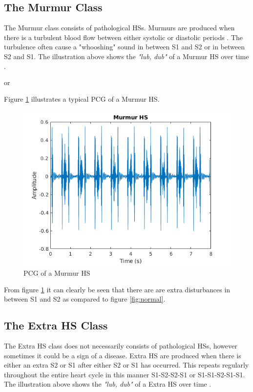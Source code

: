 \documentclass[10pt,twocolumn]{witseiepaper}
\begin{document}
\subsection*{The Murmur Class}
The Murmur class consists of pathological HSs. Murmurs are produced when there is a turbulent blood flow between either systolic or diastolic periods \cite{35}. The turbulence often cause a "whooshing" sound in between S1 and S2 or in between S2 and S1. The illustration above shows the \textit{"lub, dub"} of a Murmur HS over time \cite{bentley}.


\hspace{3.5cm} or 


Figure \ref{fig:murmur} illustrates a typical PCG of a Murmur HS.
\begin{figure}[h!]
    \centering
    \includegraphics[scale = 0.45]{./murmur.png}
    \caption{PCG of a Murmur HS}
    \label{fig:murmur}
\end{figure}{}

From figure \ref{fig:murmur} it can clearly be seen that there are are extra disturbances in between S1 and S2 as compared to figure \ref{fig:normal}.

\subsection*{The Extra HS Class}
\label{sec:extra}
The Extra HS class does not necessarily consists of pathological HSs, however sometimes it could be a sign of a disease. Extra HS are produced when there is either an extra S2 or S1 after either S2 or S1 has occurred. This repeats regularly throughout the entire heart cycle in this manner S1-S2-S2-S1 or S1-S1-S2-S1-S1.
The illustration above shows the \textit{"lub, dub"} of a Extra HS over time \cite{bentley}.
\end{document}
